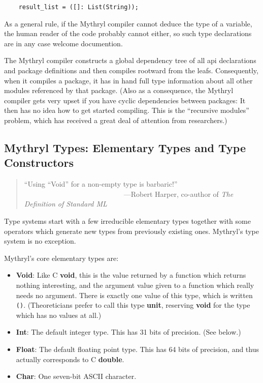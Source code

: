 \begin{verbatim}
    result_list = ([]: List(String));
\end{verbatim}

As a general rule, if the Mythryl compiler cannot deduce the type of a variable, 
the human reader of the code probably cannot either, so such type declarations 
are in any case welcome documention.

The Mythryl compiler constructs a global dependency tree of all api declarations 
and package definitions and then compiles rootward from the leafs.  Consequently, 
when it compiles a package, it has in hand full type information about all other 
modules referenced by that package.  (Also as a consequence, the Mythryl compiler 
gets very upset if you have cyclic dependencies between packages:  It then 
has no idea how to get started compiling.  This is the ``recursive modules'' 
problem, which has received a great deal of attention from researchers.)


\cutend*

\subsection{Mythryl Types:  Elementary Types and Type Constructors}

\begin{quote}\begin{tiny}
       ``Using ``Void'' for a non-empty type is barbaric!''\newline
         ~~~~~~~~~~~~~~~~~~~~~~~~~~~~---Robert Harper, co-author of {\it The Definition of Standard ML}
\end{tiny}\end{quote}

Type systems start with a few irreducible elementary types together 
with some operators which generate new types from previously existing 
ones.  Mythryl's type system is no exception.

Mythryl's core elementary types are:
\begin{itemize}
\item {\bf Void}:  Like C {\bf void}, this is the value returned by a function which returns 
nothing interesting, and the argument value given to a function which really needs 
no argument.  There is exactly one value of this type, which is written {\tt ()}. 
(Theoreticians prefer to call this type {\bf unit}, reserving {\bf void} for the type 
which has no values at all.)
\item {\bf Int}:  The default integer type.  This has 31 bits of precision. (See below.)
\item {\bf Float}:  The default floating point type.  This has 64 bits of precision, and 
thus actually corresponds to C {\bf double}.
\item {\bf Char}:  One seven-bit {\sc ASCII} character.
\end{itemize}

